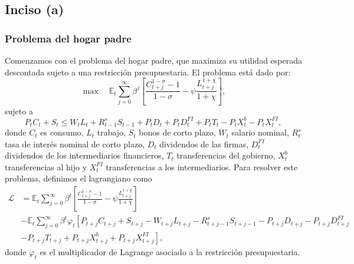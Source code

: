 \documentclass[../../entrega.tex]{subfiles}
\begin{document}
\subsection{Inciso (a)}
\subsubsection{Problema del hogar padre}
Comenzamos con el problema del hogar padre, que maximiza su utilidad esperada descontada sujeto a una restricción presupuestaria.
El problema está dado por:
\begin{equation*}
    \max \quad \mathbb{E}_t \sum_{j=0}^{\infty} \beta^j \left[\frac{C_{t + j}^{1-\sigma}-1}{1-\sigma} - \psi \frac{L_{t + j}^{1+\chi}}{1+\chi}\right],
\end{equation*}
sujeto a
\begin{equation*}
    P_t C_t + S_t \leq W_t L_t + R_{t-1}^s S_{t-1} + P_t D_t + P_t D_t^{FI} + P_t T_t - P_t X_t^b - P_t X_t^{FI},
\end{equation*}
donde $C_t$ es consumo, $L_t$ trabajo, $S_t$ bonos de corto plazo, $W_t$ salario nominal, $R_t^s$ tasa de interés nominal de corto plazo, $D_t$ dividendos de las firmas, $D_t^{FI}$ dividendos de los intermediarios financieros, $T_t$ transferencias del gobierno, $X_t^b$ transferencias al hijo y $X_t^{FI}$ transferencias a los intermediarios.
Para resolver este problema, definimos el lagrangiano como
\begin{align*}
    \mathcal{L} & = \mathbb{E}_t \sum_{j=0}^{\infty} \beta^t \left[\frac{C_{t + j}^{1-\sigma}-1}{1-\sigma} - \psi \frac{L_{t + j}^{1+\chi}}{1+\chi}\right]                                                              \\
                & - \mathbb{E}_t \sum_{j=0}^{\infty} \beta^t \varphi_t\left[P_{t + j} C_{t + j} + S_{t + j} - W_{t + j} L_{t + j} - R_{t + j -1}^s S_{t + j -1} - P_{t + j} D_{t + j} - P_{t + j} D_{t + j}^{FI}\right. \\
                & \left.- P_{t + j} T_{t + j} + P_{t + j} X_{t + j}^b + P_{t + j} X_{t + j}^{FI}\right],
\end{align*}
donde $\varphi_t$ es el multiplicador de Lagrange asociado a la restricción presupuestaria.
\end{document}

